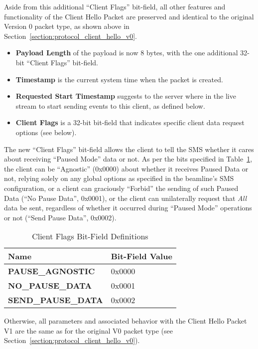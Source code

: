 Aside from this additional ``Client Flags'' bit-field,
all other features and functionality of the Client Hello Packet
are preserved and identical to the original Version 0 packet type,
as shown above in Section~\ref{section:protocol_client_hello_v0}.

\begin{itemize}
\item{\bf Payload Length} of the payload is now 8 bytes,
with the one additional 32-bit ``Client Flags'' bit-field.
\item{\bf Timestamp} is the current system time when the packet is created.
\item{\bf Requested Start Timestamp} suggests to the server where in the
live stream to start sending events to this client, as defined below.
\item{\bf Client Flags} is a 32-bit bit-field that indicates specific
client data request options (see below).
\end{itemize}

The new ``Client Flags'' bit-field allows the client to tell
the SMS whether it cares about receiving ``Paused Mode'' data or not.
As per the bits specified in Table~\ref{table:client_hello_flags},
the client can be
``Agnostic'' (0x0000) about whether it receives Paused Data or not,
relying solely on any global options as specified in the
beamline's SMS configuration,
or a client can graciously ``Forbid'' the sending of such Paused Data
(``No Pause Data'', 0x0001),
or the client can unilaterally request that {\it All} data be sent,
regardless of whether it occurred during ``Paused Mode'' operations or not
(``Send Pause Data'', 0x0002).

\begin{table}[h]
  \begin{center}
    \begin{tabular}{l | l}
	Name & Bit-Field Value \\
	\hline
	{\bf PAUSE\_AGNOSTIC} & 0x0000 \\
	{\bf NO\_PAUSE\_DATA} & 0x0001 \\
	{\bf SEND\_PAUSE\_DATA} & 0x0002 \\
    \end{tabular}
  \end{center}
  \caption {Client Flags Bit-Field Definitions}
  \label{table:client_hello_flags}
\end{table}

Otherwise, all parameters and associated behavior with the
Client Hello Packet V1 are the same as for the original V0 packet type
(see Section~\ref{section:protocol_client_hello_v0}).


